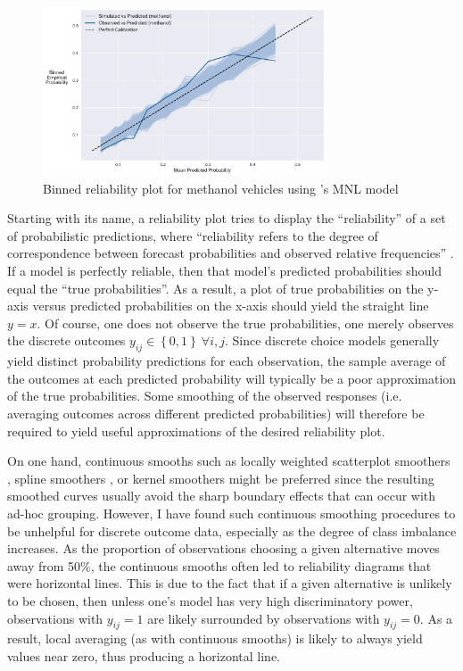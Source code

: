 \documentclass[preprint]{elsarticle}
\begin{document}
\begin{figure}
\centering
\includegraphics[width=0.75\textwidth]{reliability-plot-vehicle-choice-mnl-methanol-point}
\caption{Binned reliability plot for methanol vehicles using \citeauthor{brownstone_forecasting_1998}'s MNL model}
\label{fig:orig-mnl-methanol-reliability}
\end{figure}

Starting with its name, a reliability plot tries to display the ``reliability'' of a set of probabilistic predictions, where ``reliability refers to the degree of correspondence between forecast probabilities and observed relative frequencies'' \citep[p.41]{murphy_reliability_1977}. If a model is perfectly reliable, then that model's predicted probabilities should equal the ``true probabilities''. As a result, a plot of true probabilities on the y-axis versus predicted probabilities on the x-axis should yield the straight line $y = x$. Of course, one does not observe the true probabilities, one merely observes the discrete outcomes $y_{ij} \in \left\lbrace 0, 1 \right\rbrace \ \forall i, j$. Since discrete choice models generally yield distinct probability predictions for each observation, the sample average of the outcomes at each predicted probability will typically be a poor approximation of the true probabilities. Some smoothing of the observed responses (i.e. averaging outcomes across different predicted probabilities) will therefore be required to yield useful approximations of the desired reliability plot.

On one hand, continuous smooths such as locally weighted scatterplot smoothers \citep{cleveland_bootstrap_1979}, spline smoothers \citep{silverman_spline_1984}, or kernel smoothers \citep{ghosh_kernel_2018} might be preferred since the resulting smoothed curves usually avoid the sharp boundary effects that can occur with ad-hoc grouping. However, I have found such continuous smoothing procedures to be unhelpful for discrete outcome data, especially as the degree of class imbalance increases. As the proportion of observations choosing a given alternative moves away from 50\%, the continuous smooths often led to reliability diagrams that were horizontal lines. This is due to the fact that if a given alternative is unlikely to be chosen, then unless one's model has very high discriminatory power, observations with $y_{ij} = 1$ are likely surrounded by observations with $y_{ij} = 0$. As a result, local averaging (as with continuous smooths) is likely to always yield values near zero, thus producing a horizontal line.
\end{document}
